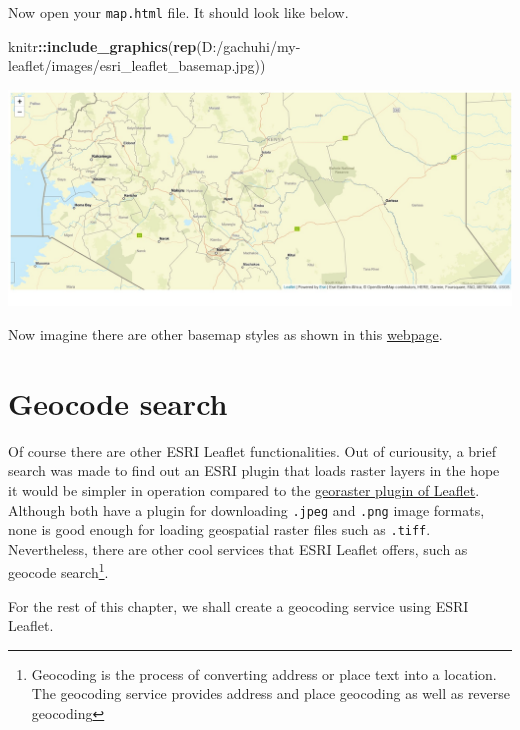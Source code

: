 \documentclass[
]{book}
\newenvironment{Shaded}{\begin{snugshade}}{\end{snugshade}}
\newcommand{\FunctionTok}[1]{\textcolor[rgb]{0.13,0.29,0.53}{\textbf{#1}}}
\newcommand{\NormalTok}[1]{#1}
\newcommand{\SpecialCharTok}[1]{\textcolor[rgb]{0.81,0.36,0.00}{\textbf{#1}}}
\newcommand{\StringTok}[1]{\textcolor[rgb]{0.31,0.60,0.02}{#1}}
\begin{document}
Now open your \texttt{map.html} file. It should look like below.

\begin{Shaded}
\begin{Highlighting}[]
\NormalTok{knitr}\SpecialCharTok{::}\FunctionTok{include\_graphics}\NormalTok{(}\FunctionTok{rep}\NormalTok{(}\StringTok{\textquotesingle{}D:/gachuhi/my{-}leaflet/images/esri\_leaflet\_basemap.jpg\textquotesingle{}}\NormalTok{))}
\end{Highlighting}
\end{Shaded}

\includegraphics{../images/esri_leaflet_basemap.jpg}

Now imagine there are other basemap styles as shown in this \href{https://developers.arcgis.com/documentation/mapping-apis-and-services/maps/services/basemap-layer-service/\#default-basemap-styles}{webpage}.

\hypertarget{geocode-search}{%
\section{Geocode search}\label{geocode-search}}

Of course there are other ESRI Leaflet functionalities. Out of curiousity, a brief search was made to find out an ESRI plugin that loads raster layers in the hope it would be simpler in operation compared to the \href{https://github.com/GeoTIFF/georaster-layer-for-leaflet}{georaster plugin of Leaflet}. Although both have a plugin for downloading \texttt{.jpeg} and \texttt{.png} image formats, none is good enough for loading geospatial raster files such as \texttt{.tiff}. Nevertheless, there are other cool services that ESRI Leaflet offers, such as geocode search\footnote{Geocoding is the process of converting address or place text into a location. The geocoding service provides address and place geocoding as well as reverse geocoding}.

For the rest of this chapter, we shall create a geocoding service using ESRI Leaflet.
\end{document}
